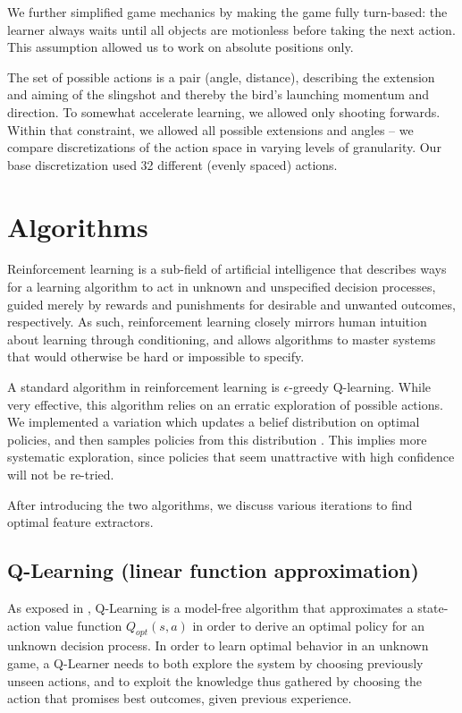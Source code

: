\documentclass[fleqn,10pt]{SelfArx} %
\begin{document}
We further simplified game mechanics by making the game fully turn-based: the learner always waits until all objects are motionless before taking the next action. This assumption allowed us to work on absolute positions only.

The set of possible actions is a pair (angle, distance), describing the extension and aiming of the slingshot and thereby the bird's launching momentum and direction. To somewhat accelerate learning, we allowed only shooting forwards. Within that constraint, we allowed all possible extensions and angles -- we compare discretizations of the action space in varying levels of granularity. Our base discretization used 32 different (evenly spaced) actions.


\section{Algorithms}

Reinforcement learning is a sub-field of artificial intelligence that describes ways for a learning algorithm to act in unknown and unspecified decision processes, guided merely by rewards and punishments for desirable and unwanted outcomes, respectively. As such, reinforcement learning closely mirrors human intuition about learning through conditioning, and allows algorithms to master systems that would otherwise be hard or impossible to specify.

A standard algorithm in reinforcement learning is $\epsilon$-greedy Q-learning. While very effective, this algorithm relies on an erratic exploration of possible actions. We implemented a variation which updates a belief distribution on optimal policies, and then samples policies from this distribution \cite{osband2014generalization}. This implies more systematic exploration, since policies that seem unattractive with high confidence will not be re-tried. 

After introducing the two algorithms, we discuss various iterations to find optimal feature extractors.

\subsection{Q-Learning (linear function approximation)}
As exposed in \cite{sutton1998reinforcement}, Q-Learning is a model-free algorithm that approximates a state-action value function $Q_{opt}(s,a)$ in order to derive an optimal policy for an unknown decision process. In order to learn optimal behavior in an unknown game, a Q-Learner needs to both explore the system by choosing previously unseen actions, and to exploit the knowledge thus gathered by choosing the action that promises best outcomes, given previous experience.
\end{document}
